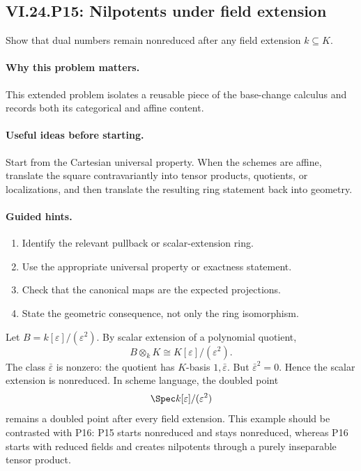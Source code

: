 \subsection*{VI.24.P15: Nilpotents under field extension}
\begin{problem}\label{prob:vi24-p15}
Show that dual numbers remain nonreduced after any field extension $k\subseteq K$.
\end{problem}

\ifdefined\FullProblemDossiers
\paragraph{Why this problem matters.}
This extended problem isolates a reusable piece of the base-change calculus and records both its categorical and affine content.

\paragraph{Useful ideas before starting.}
Start from the Cartesian universal property.  When the schemes are affine, translate the square contravariantly into tensor products, quotients, or localizations, and then translate the resulting ring statement back into geometry.

\paragraph{Guided hints.}
\begin{enumerate}
\item Identify the relevant pullback or scalar-extension ring.
\item Use the appropriate universal property or exactness statement.
\item Check that the canonical maps are the expected projections.
\item State the geometric consequence, not only the ring isomorphism.
\end{enumerate}

\begin{solution}
Let $B=k[\varepsilon]/(\varepsilon^2)$.  By scalar extension of a polynomial quotient,
\[
B\otimes_kK\cong K[\varepsilon]/(\varepsilon^2).
\]
The class $\bar\varepsilon$ is nonzero: the quotient has $K$-basis $1,\bar\varepsilon$.  But
$\bar\varepsilon^2=0$.  Hence the scalar extension is nonreduced.  In scheme language, the doubled point
\[
\Spec k[\varepsilon]/(\varepsilon^2)
\]
remains a doubled point after every field extension.  This example should be contrasted with P16: P15 starts nonreduced and stays nonreduced, whereas P16 starts with reduced fields and creates nilpotents through a purely inseparable tensor product.
\end{solution}

